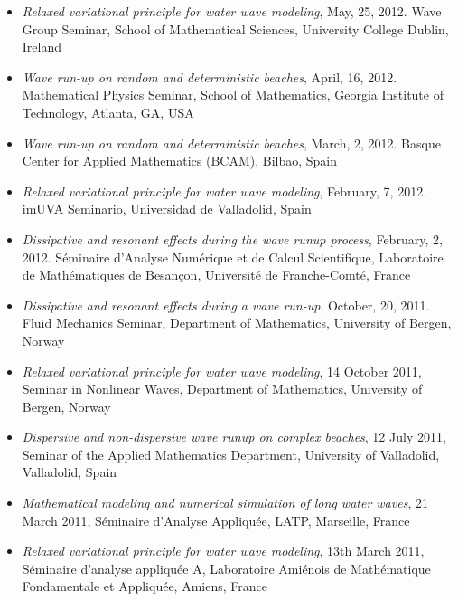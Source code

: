 \documentclass[final, a4paper, oneside, 12pt]{article}
\numberwithin{equation}{section}
\begin{document}
\begin{itemize}
  \item \textit{Relaxed variational principle for water wave modeling}, May, 25, 2012. Wave Group Seminar, School of Mathematical Sciences, University College Dublin, Ireland

  \item \textit{Wave run-up on random and deterministic beaches}, April, 16, 2012. Mathematical Physics Seminar, School of Mathematics, Georgia Institute of Technology, Atlanta, GA, USA

  \item \textit{Wave run-up on random and deterministic beaches}, March, 2, 2012. Basque Center for Applied Mathematics (BCAM), Bilbao, Spain

  \item \textit{Relaxed variational principle for water wave modeling}, February, 7, 2012. imUVA Seminario, Universidad de Valladolid, Spain
  
  \item \textit{Dissipative and resonant effects during the wave runup process}, February, 2, 2012. S\'eminaire d'Analyse Num\'erique et de Calcul Scientifique, Laboratoire de Math\'ematiques de Besan\c{c}on, Universit\'e de Franche-Comt\'e, France

  \item \textit{Dissipative and resonant effects during a wave run-up}, October, 20, 2011. Fluid Mechanics Seminar, Department of Mathematics, University of Bergen, Norway

  \item \textit{Relaxed variational principle for water wave modeling}, 14 October 2011, Seminar in Nonlinear Waves, Department of Mathematics, University of Bergen, Norway

  \item \textit{Dispersive and non-dispersive wave runup on complex beaches}, 12 July 2011, Seminar of the Applied Mathematics Department, University of Valladolid, Valladolid, Spain
  
  \item \textit{Mathematical modeling and numerical simulation of long water waves},  21 March 2011, S\'eminaire d'Analyse Appliqu\'ee, LATP, Marseille, France
  
  \item \textit{Relaxed variational principle for water wave modeling}, 13th March 2011, S\'eminaire d'analyse appliqu\'ee A, Laboratoire Ami\'enois de Math\'ematique Fondamentale et Appliqu\'ee, Amiens, France
  

\end{itemize}
\end{document}
